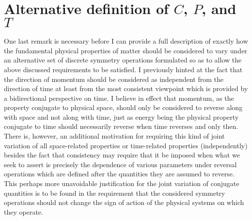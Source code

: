 \documentclass[notitlepage,12pt]{report}
\begin{document}
\section{Alternative definition of $C$, $P$, and $T$}

One last remark is necessary before I can provide a full description of exactly how the fundamental physical properties of matter should be considered to vary under an alternative set of discrete symmetry operations formulated so as to allow the above discussed requirements to be satisfied. I previously hinted at the fact that the direction of momentum should be considered as independent from the direction of time at least from the most consistent viewpoint which is provided by a bidirectional perspective on time. I believe in effect that momentum, as the property conjugate to physical space, should only be considered to reverse along with space and not along with time, just as energy being the physical property conjugate to time should necessarily reverse when time reverses and only then. There is, however, an additional motivation for requiring this kind of joint variation of all space-related properties or time-related properties (independently) besides the fact that consistency may require that it be imposed when what we seek to assert is precisely the dependence of various parameters under reversal operations which are defined after the quantities they are assumed to reverse. This perhaps more unavoidable justification for the joint variation of conjugate quantities is to be found in the requirement that the considered symmetry operations should not change the sign of action of the physical systems on which they operate.
\end{document}
